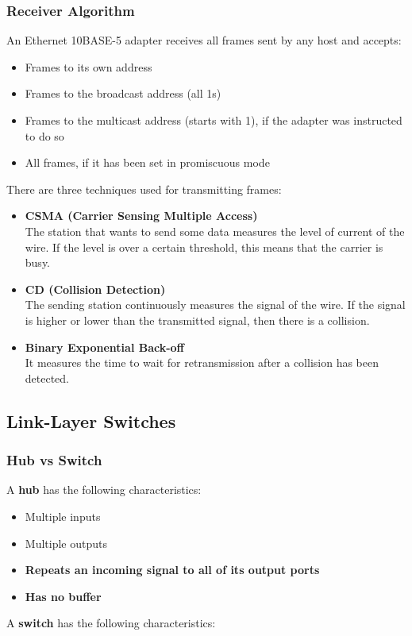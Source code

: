 \documentclass{article}
\begin{document}
\subsubsection{Receiver Algorithm}
An Ethernet 10BASE-5 adapter receives all frames sent by any host and accepts:

\begin{itemize}
	\item Frames to its own address
	\item Frames to the broadcast address (all 1s)
	\item Frames to the multicast address (starts with 1), if the adapter was instructed to do so
	\item All frames, if it has been set in promiscuous mode
\end{itemize}
There are three techniques used for transmitting frames:

\begin{itemize}
	\item \textbf{CSMA (Carrier Sensing Multiple Access)} 
	\vspace{.2cm} \\
	The station that wants to send some data measures the level of current of the wire. If the level is over a certain threshold, this means that the carrier is busy.
	
	\item \textbf{CD (Collision Detection)}
	\vspace{.2cm} \\
	The sending station continuously measures the signal of the wire. If the signal is higher or lower than the transmitted signal, then there is a collision.
	
	\item \textbf{Binary Exponential Back-off}
	\vspace{.2cm} \\
	It measures the time to wait for retransmission after a collision has been detected.
\end{itemize}

\subsection{Link-Layer Switches}
\subsubsection{Hub vs Switch}
A \textbf{hub} has the following characteristics:

\begin{itemize}
	\item Multiple inputs
	\item Multiple outputs
	\item \textbf{Repeats an incoming signal to all of its output ports}
	\item \textbf{Has no buffer}
\end{itemize}
A \textbf{switch} has the following characteristics:
\end{document}
